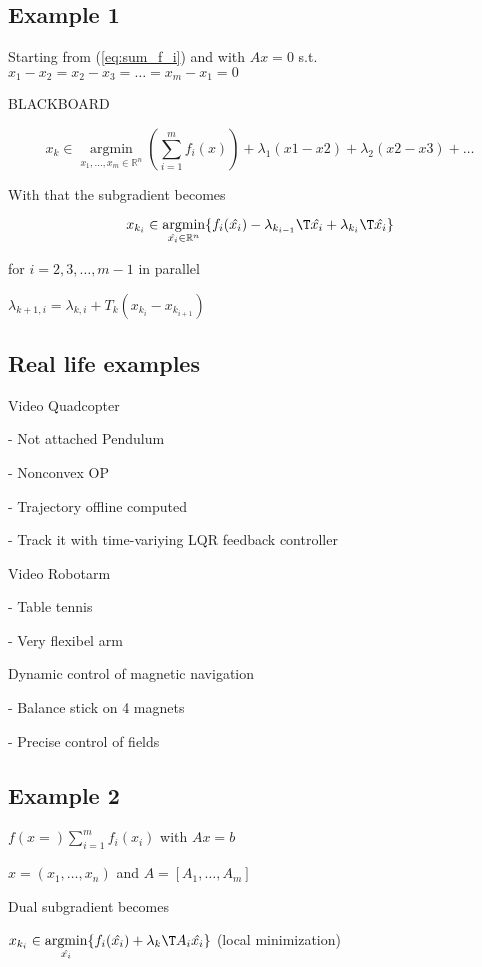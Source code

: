 \subsection{Example 1}

Starting from (\ref{eq:sum_f_i}) and with $Ax=0$
s.t. $x_1-x_2=x_2-x_3=\dots=x_m-x_1=0$

BLACKBOARD

$$ x_{k}\in \underset{x_1,\dots,x_m\in \mathbb{R}^{n}} {\operatorname{argmin}}
	(\sum_{i = 1}^{m} f_i(x)) + \lambda_1(x1-x2) + \lambda_2(x2-x3) +\dots$$

With that the subgradient becomes

$$ x_{k_i}\in \underset{\hat{x_i}\in \mathbb{R}^{n}} {\operatorname{argmin}}
	\{f_i(\hat{x_i})-\lambda_{k_{i-1}}\T\hat{x_i}+\lambda_{k_{i}}\T\hat{x_i}\} $$

for $i=2,3,\dots,m-1$ in parallel


$\lambda_{k+1,i}=\lambda_{k,i}+T_k(x_{k_i}-x_{k_{i+1}})$

\subsection{Real life examples}

Video Quadcopter

- Not attached Pendulum

- Nonconvex OP

- Trajectory offline computed

- Track it with time-variying LQR feedback controller

Video Robotarm

- Table tennis

- Very flexibel arm

Dynamic control of magnetic navigation

- Balance stick on 4 magnets

- Precise control of fields

\subsection{Example 2}


$f(x=) \sum_{i = 1}^{m} f_i(x_i)$ with $Ax=b$

$x = (x_1,\dots,x_n)$ and $A=[A_1,\dots,A_m]$

Dual subgradient becomes

$x_{k_i}\in \underset{\hat{x_i}} {\operatorname{argmin}} \{f_i(\hat{x_i})+\lambda_{k}\T A_i\hat{x_i}\}$
(local minimization)


